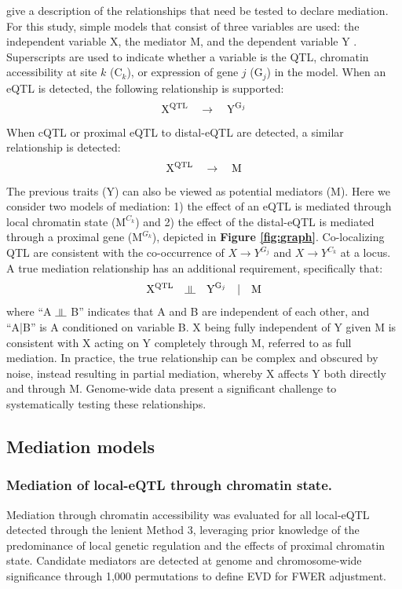 \documentclass[9pt,twocolumn,twoside]{gsajnl}
\newcommand{\indep}{\rotatebox[origin=c]{90}{$\models$}}
\begin{document}
\cite{Baron1986} give a description of the relationships that need be tested to declare mediation. For this study, simple models that consist of three variables are used: the independent variable X, the mediator M, and the dependent variable Y \citep{MacKinnon2007}. Superscripts are used to indicate whether a variable is the QTL, chromatin accessibility at site $k$ ($\text{C}_{k}$), or expression of gene $j$ ($\text{G}_{j}$) in the model. When an eQTL is detected, the following relationship is supported:
\begin{equation}
\text{X}\textsuperscript{QTL} \quad \rightarrow \quad \text{Y}^{\text{G}_{j}}
\label{rel:eQTL}
\end{equation}
When cQTL or proximal eQTL to distal-eQTL are detected, a similar relationship is detected:
\begin{equation}
\text{X}\textsuperscript{QTL} \quad \rightarrow \quad \text{M}
\label{rel:cQTL}
\end{equation}
The previous traits (Y) can also be viewed as potential mediators (M). Here we consider two models of mediation: 1) the effect of an eQTL is mediated through local chromatin state ($\text{M}^{C_{k}}$) and 2) the effect of the distal-eQTL is mediated through a proximal gene ($\text{M}^{G_{k}}$), depicted in \textbf{Figure \ref{fig:graph}}. Co-localizing QTL are consistent with the co-occurrence of $X \rightarrow Y^{G_{j}}$ and $X \rightarrow Y^{C_{k}}$ at a locus. A true mediation relationship has an additional requirement, specifically that: 
\begin{equation}
\text{X}\textsuperscript{QTL} \quad \indep \quad \text{Y}^{\text{G}_{j}} \quad | \quad \text{M}
\label{rel:full_mediator}
\end{equation}
where ``A $\indep$ B'' indicates that A and B are independent of each other, and ``A|B'' is A conditioned on variable B. X being fully independent of Y given M is consistent with X acting on Y completely through M, referred to as full mediation. In practice, the true relationship can be complex and obscured by noise, instead resulting in partial mediation, whereby X affects Y both directly and through M. Genome-wide data present a significant challenge to systematically testing these relationships.

\subsection{Mediation models}

\subsubsection{Mediation of local-eQTL through chromatin state.}
Mediation through chromatin accessibility was evaluated for all local-eQTL detected through the lenient Method 3, leveraging prior knowledge of the predominance of local genetic regulation and the effects of proximal chromatin state. Candidate mediators are detected at genome and chromosome-wide significance through 1,000 permutations to define EVD for FWER adjustment.
\end{document}

